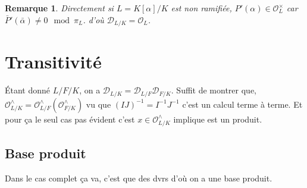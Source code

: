 \documentclass[a4paper,12pt]{book}
\newcommand{\Or}{\mathcal{O}}
\newcommand{\D}{\mathscr{D}}
\theoremstyle{plain}
\newtheorem{rem}{Remarque}
\theoremstyle{definition}
\theoremstyle{remark}
\begin{document}
\begin{rem}
    Directement si $L=K[\alpha]/K$ est non ramifiée, $P'(\alpha)\in \Or_L^\times$
    car $\bar P'(\bar \alpha)\ne 0\mod \pi_L$.
    d'où $\D_{L/K}=\Or_L$.
\end{rem}

\section{Transitivité}
Étant donné $L/F/K$, on a $\D_{L/K}=\D_{L/F}\D_{F/K}$. Suffit de montrer
que, $\Or_{L/K}^\wedge=\Or_{L/F}^\wedge(\Or_{F/K}^\wedge)$ vu que 
$(IJ)^{-1}=I^{-1}J^{-1}$ c'est un calcul terme à terme. Et pour ça 
le seul cas pas évident c'est $x\in \Or_{L/K}^\wedge$ implique est
un produit.
\subsection{Base produit}
Dans le cas complet ça va, c'est que des dvrs d'où
on a une base produit. 
\end{document}
